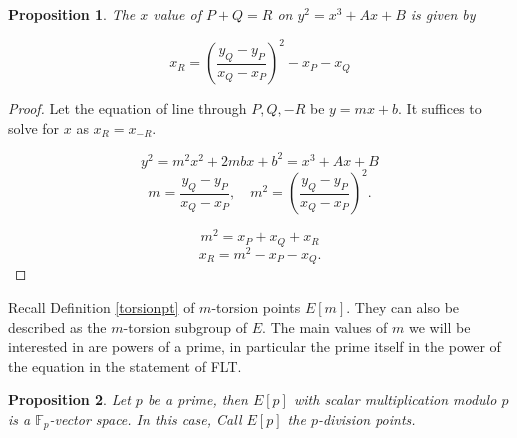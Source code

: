 \documentclass{article}
\newtheorem{prop}{Proposition}[section]
\theoremstyle{definition}
\newtheorem{definition}{Definition}[section]
\theoremstyle{definition}
\theoremstyle{definition}
\newcommand{\F}{\mathbb{F}}
\begin{document}
\begin{prop}
The $x$ value of $P+Q=R$ on $y^2 = x^3 + Ax + B$ is given by

\[
x_R = \left( \frac{y_Q - y_P}{x_Q - x_P} \right)^2 - x_P - x_Q
\]

    
\end{prop}

\begin{proof} 

Let the equation of line through $P,Q,-R$ be $y=mx+b$. It suffices to solve for $x$ as $x_R=x_{-R}$.

\[
y^2 = m^2 x^2 + 2mbx + b^2 = x^3 + Ax + B
\]
\[
m = \frac{y_Q - y_P}{x_Q - x_P}, \quad m^2 = \left( \frac{y_Q - y_P}{x_Q - x_P} \right)^2.
\]



\[
m^2 = x_P + x_Q + x_R
\]
$$x_R=m^2-x_P-x_Q.$$
    
\end{proof}

Recall Definition \ref{torsionpt} of $m$-torsion points $E[m]$. They can also be described as the $m$-torsion subgroup of $E$.
\newline\newline
The main values of $m$ we will be interested in are powers of a prime, in particular the prime itself in the power of the equation in the statement of FLT.
\begin{prop}\label{divpts} Let $p$ be a prime, then
    $E[p]$ with scalar multiplication modulo $p$ is a $\F_p$-vector space. In this case, Call $E[p]$ the $p$-division points.
\end{prop}
    
\end{document}
